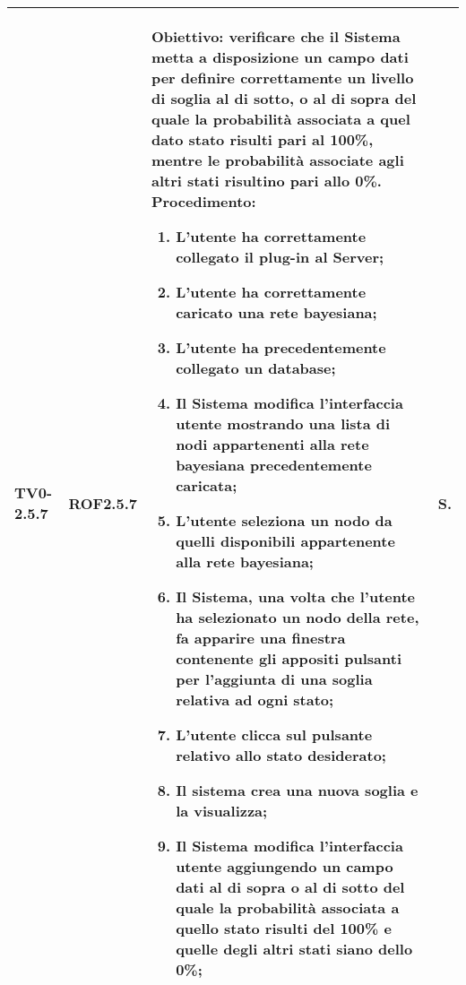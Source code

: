 \begin{longtable}{|C{.15\textwidth}|C{.13\textwidth}|m{.65\textwidth}|C{.08\textwidth}|}
TV0-2.5.7 & ROF2.5.7 &
	\textbf{Obiettivo}: verificare che il Sistema metta a disposizione un campo dati per definire correttamente un livello di soglia al di sotto, o al di sopra del quale la probabilità associata a quel dato stato risulti pari al 100\%, mentre le probabilità associate agli altri stati risultino pari allo 0\%. \newline
	\textbf{Procedimento}:
	\begin{enumerate}
		\item L'utente ha correttamente collegato il plug-in al Server;
		\item L'utente ha correttamente caricato una rete bayesiana;
		\item L'utente ha precedentemente collegato un database;
		\item Il Sistema modifica l'interfaccia utente mostrando una lista di nodi appartenenti alla rete bayesiana precedentemente caricata;
		\item L'utente seleziona un nodo da quelli disponibili appartenente alla rete bayesiana;
		\item Il Sistema, una volta che l'utente ha selezionato un nodo della rete, fa apparire una finestra contenente gli appositi pulsanti per l'aggiunta di una soglia relativa ad ogni stato;
		\item L'utente clicca sul pulsante relativo allo stato desiderato;
		\item Il sistema crea una nuova soglia e la visualizza;
		\item Il Sistema modifica l'interfaccia utente aggiungendo un campo dati al di sopra o al di sotto del quale la probabilità associata a quello stato risulti del 100\% e quelle degli altri stati siano dello 0\%;
	\end{enumerate}
	& S. \\
\hline


\end{longtable}
